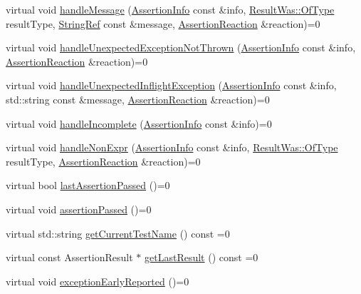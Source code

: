 \begin{DoxyCompactItemize}
\item 
virtual void \hyperlink{struct_catch_1_1_i_result_capture_a21788ebc64571abf322b80c8cc51794d}{handle\-Message} (\hyperlink{struct_catch_1_1_assertion_info}{Assertion\-Info} const \&info, \hyperlink{struct_catch_1_1_result_was_a624e1ee3661fcf6094ceef1f654601ef}{Result\-Was\-::\-Of\-Type} result\-Type, \hyperlink{class_catch_1_1_string_ref}{String\-Ref} const \&message, \hyperlink{struct_catch_1_1_assertion_reaction}{Assertion\-Reaction} \&reaction)=0
\item 
virtual void \hyperlink{struct_catch_1_1_i_result_capture_a6382ed20486e2d9a020da971c6d5c53d}{handle\-Unexpected\-Exception\-Not\-Thrown} (\hyperlink{struct_catch_1_1_assertion_info}{Assertion\-Info} const \&info, \hyperlink{struct_catch_1_1_assertion_reaction}{Assertion\-Reaction} \&reaction)=0
\item 
virtual void \hyperlink{struct_catch_1_1_i_result_capture_afc97bc69829185222f955ebeef97adfe}{handle\-Unexpected\-Inflight\-Exception} (\hyperlink{struct_catch_1_1_assertion_info}{Assertion\-Info} const \&info, std\-::string const \&message, \hyperlink{struct_catch_1_1_assertion_reaction}{Assertion\-Reaction} \&reaction)=0
\item 
virtual void \hyperlink{struct_catch_1_1_i_result_capture_a89b89372eb09cc44f8dcad363de6157d}{handle\-Incomplete} (\hyperlink{struct_catch_1_1_assertion_info}{Assertion\-Info} const \&info)=0
\item 
virtual void \hyperlink{struct_catch_1_1_i_result_capture_ab7dbdf8aa28427119583e24dbb302c63}{handle\-Non\-Expr} (\hyperlink{struct_catch_1_1_assertion_info}{Assertion\-Info} const \&info, \hyperlink{struct_catch_1_1_result_was_a624e1ee3661fcf6094ceef1f654601ef}{Result\-Was\-::\-Of\-Type} result\-Type, \hyperlink{struct_catch_1_1_assertion_reaction}{Assertion\-Reaction} \&reaction)=0
\item 
virtual bool \hyperlink{struct_catch_1_1_i_result_capture_a973435fbdcb2f6f07a0ec5719a01e956}{last\-Assertion\-Passed} ()=0
\item 
virtual void \hyperlink{struct_catch_1_1_i_result_capture_a9b0ef2cb071e9a9dc6ec1b533026aea7}{assertion\-Passed} ()=0
\item 
virtual std\-::string \hyperlink{struct_catch_1_1_i_result_capture_aea1617f4a84cc648246aa3ed6918b5bf}{get\-Current\-Test\-Name} () const =0
\item 
virtual const Assertion\-Result $\ast$ \hyperlink{struct_catch_1_1_i_result_capture_ab18872c89fab97405a56e9c6a4919736}{get\-Last\-Result} () const =0
\item 
virtual void \hyperlink{struct_catch_1_1_i_result_capture_ae63ecec95db4c236c63ecf616f483810}{exception\-Early\-Reported} ()=0
\end{DoxyCompactItemize}


